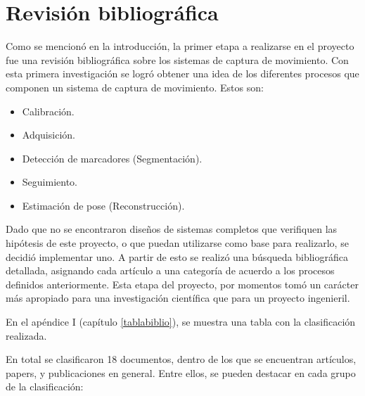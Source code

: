 \section{Revisión bibliográfica}
\label{invBiblio}

Como se mencionó en la introducción, la primer etapa a realizarse en el proyecto fue una revisión bibliográfica sobre los sistemas de captura de movimiento. Con esta primera investigación se logró obtener una idea de los diferentes procesos que componen un sistema de captura de movimiento. Estos son:

\begin{itemize}
	\item Calibración.
	\item Adquisición.
	\item Detección de marcadores (Segmentación).
	\item Seguimiento.
	\item Estimación de pose (Reconstrucción).
\end{itemize}

Dado que no se encontraron diseños de sistemas completos que verifiquen las hipótesis de este proyecto, o que puedan utilizarse como base para realizarlo, se decidió implementar uno. A partir de esto se realizó una búsqueda bibliográfica detallada, asignando cada artículo a una categoría de acuerdo a los procesos definidos anteriormente. Esta etapa del proyecto, por momentos tomó un carácter más apropiado para una investigación científica que para un proyecto ingenieril. 

En el apéndice I (capítulo \ref{tablabiblio}), se muestra una tabla con la clasificación realizada.


En total se clasificaron 18 documentos, dentro de los que se encuentran artículos, papers, y publicaciones en general. Entre ellos, se pueden destacar en cada grupo de la clasificación:

